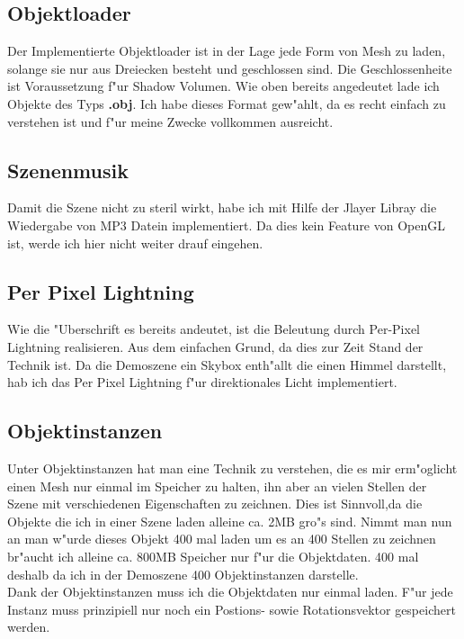 \documentclass[a4paper,titlepage]{article}
\begin{document}
\subsection{Objektloader}
Der Implementierte Objektloader ist in der Lage jede Form von Mesh zu laden, solange sie nur aus Dreiecken 
besteht und geschlossen sind. Die Geschlossenheite ist Voraussetzung f"ur Shadow Volumen.
Wie oben bereits angedeutet lade ich Objekte des Typs \textbf{.obj}. Ich habe dieses Format gew"ahlt, da es 
recht einfach zu verstehen ist und f"ur meine Zwecke vollkommen ausreicht. 

\subsection{Szenenmusik}
Damit die Szene nicht zu steril wirkt, habe ich mit Hilfe der Jlayer Libray die Wiedergabe von MP3 Datein
implementiert. Da dies kein Feature von OpenGL ist, werde ich hier nicht weiter drauf eingehen. 

\subsection{Per Pixel Lightning}
Wie die "Uberschrift es bereits andeutet, ist die Beleutung durch Per-Pixel Lightning realisieren. 
Aus dem einfachen Grund, da dies zur Zeit Stand der Technik ist. Da die Demoszene ein Skybox
enth"allt die einen Himmel darstellt, hab ich das Per Pixel Lightning f"ur direktionales Licht implementiert.

\subsection{Objektinstanzen}
Unter Objektinstanzen hat man eine Technik zu verstehen, die es mir erm"oglicht einen Mesh nur einmal im 
Speicher zu halten, ihn aber an vielen Stellen der Szene mit verschiedenen Eigenschaften zu zeichnen. Dies 
ist Sinnvoll,da die Objekte die ich in einer Szene laden alleine ca. 2MB gro"s sind. Nimmt man nun an man w"urde 
dieses Objekt 400 mal laden um es an 400 Stellen zu zeichnen br"aucht ich alleine ca. 800MB Speicher nur 
f"ur die Objektdaten. 400 mal deshalb da ich in der Demoszene 400 Objektinstanzen darstelle.\\
Dank der Objektinstanzen muss ich die Objektdaten nur einmal laden. F"ur jede Instanz muss prinzipiell nur noch 
ein Postions- sowie Rotationsvektor gespeichert werden.
\end{document}
